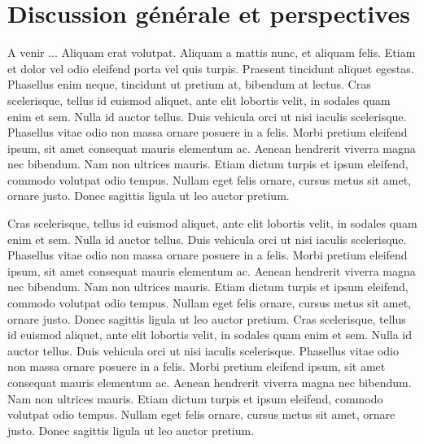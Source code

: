 \chapter*{Discussion générale et perspectives}

\lettrine[lines=3]{A}{} venir ... Aliquam erat volutpat. Aliquam a mattis nunc, et aliquam felis. Etiam et dolor vel odio eleifend porta vel quis turpis. Praesent tincidunt aliquet egestas. Phasellus enim neque, tincidunt ut pretium at, bibendum at lectus. Cras scelerisque, tellus id euismod aliquet, ante elit lobortis velit, in sodales quam enim et sem. Nulla id auctor tellus. Duis vehicula orci ut nisi iaculis scelerisque. Phasellus vitae odio non massa ornare posuere in a felis. Morbi pretium eleifend ipsum, sit amet consequat mauris elementum ac. Aenean hendrerit viverra magna nec bibendum. Nam non ultrices mauris. Etiam dictum turpis et ipsum eleifend, commodo volutpat odio tempus. Nullam eget felis ornare, cursus metus sit amet, ornare justo. Donec sagittis ligula ut leo auctor pretium.

\par Cras scelerisque, tellus id euismod aliquet, ante elit lobortis velit, in sodales quam enim et sem. Nulla id auctor tellus. Duis vehicula orci ut nisi iaculis scelerisque. Phasellus vitae odio non massa ornare posuere in a felis. Morbi pretium eleifend ipsum, sit amet consequat mauris elementum ac. Aenean hendrerit viverra magna nec bibendum. Nam non ultrices mauris. Etiam dictum turpis et ipsum eleifend, commodo volutpat odio tempus. Nullam eget felis ornare, cursus metus sit amet, ornare justo. Donec sagittis ligula ut leo auctor pretium. Cras scelerisque, tellus id euismod aliquet, ante elit lobortis velit, in sodales quam enim et sem. Nulla id auctor tellus. Duis vehicula orci ut nisi iaculis scelerisque. Phasellus vitae odio non massa ornare posuere in a felis. Morbi pretium eleifend ipsum, sit amet consequat mauris elementum ac. Aenean hendrerit viverra magna nec bibendum. Nam non ultrices mauris. Etiam dictum turpis et ipsum eleifend, commodo volutpat odio tempus. Nullam eget felis ornare, cursus metus sit amet, ornare justo. Donec sagittis ligula ut leo auctor pretium.

